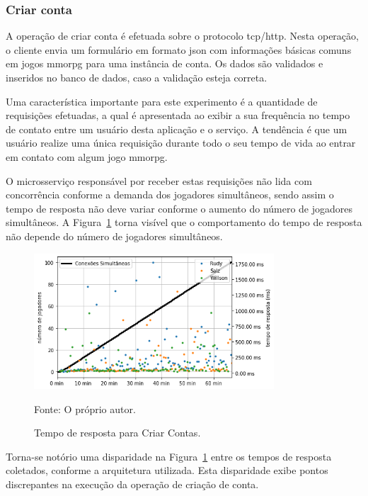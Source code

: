 \subsubsection{Criar conta}
\label{sec:op_create_account}

A operação de criar conta é efetuada sobre o protocolo \ac{tcp}/\ac{http}.
%
Nesta operação, o cliente envia um formulário em formato \ac{json} com informações básicas comuns em jogos \ac{mmorpg} para uma instância de conta.
%
Os dados são validados e inseridos no banco de dados, caso a validação esteja correta.

Uma característica importante para este experimento é a quantidade de requisições efetuadas, a qual é apresentada ao exibir a sua frequência no tempo de contato entre um usuário desta aplicação e o serviço.
%
A tendência é que um usuário realize uma única requisição durante todo o seu tempo de vida ao entrar em contato com algum jogo \ac{mmorpg}.

O microsserviço responsável por receber estas requisições não lida com concorrência conforme a demanda dos jogadores simultâneos, sendo assim o tempo de resposta não deve variar conforme o aumento do número de jogadores simultâneos.
%
A Figura~\ref{fig:create_account_operation_request_time} torna visível que o comportamento do tempo de resposta não depende do número de jogadores simultâneos.

\begin{figure}[htb!]
  \caption{Tempo de resposta para Criar Contas.}
  \label{fig:create_account_operation_request_time}
  \includegraphics[width=0.8\textwidth]{figuras/analise/rt/create_account_operation_request_time.png}
  \centering

  Fonte: O próprio autor.
\end{figure}

Torna-se notório uma disparidade na Figura~\ref{fig:create_account_operation_request_time} entre os tempos de resposta coletados, conforme a arquitetura utilizada.
%
Esta disparidade exibe pontos discrepantes na execução da operação de criação de conta.

